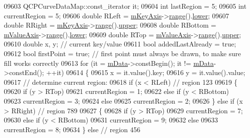 \begin{DoxyCode}
09603   QCPCurveDataMap::const\_iterator it;
09604   \textcolor{keywordtype}{int} lastRegion = 5;
09605   \textcolor{keywordtype}{int} currentRegion = 5;
09606   \textcolor{keywordtype}{double} RLeft = \hyperlink{a00024_a692421b963472fa6e16156a74ba96832}{mKeyAxis}->\hyperlink{a00025_ab1ea79a4f5ea4cf42620f8f51c477ac4}{range}().\hyperlink{a00049_aa3aca3edb14f7ca0c85d912647b91745}{lower};
09607   \textcolor{keywordtype}{double} RRight = \hyperlink{a00024_a692421b963472fa6e16156a74ba96832}{mKeyAxis}->\hyperlink{a00025_ab1ea79a4f5ea4cf42620f8f51c477ac4}{range}().\hyperlink{a00049_ae44eb3aafe1d0e2ed34b499b6d2e074f}{upper};
09608   \textcolor{keywordtype}{double} RBottom = \hyperlink{a00024_acfc46d619ab9598be33b64146da45822}{mValueAxis}->\hyperlink{a00025_ab1ea79a4f5ea4cf42620f8f51c477ac4}{range}().\hyperlink{a00049_aa3aca3edb14f7ca0c85d912647b91745}{lower};
09609   \textcolor{keywordtype}{double} RTop = \hyperlink{a00024_acfc46d619ab9598be33b64146da45822}{mValueAxis}->\hyperlink{a00025_ab1ea79a4f5ea4cf42620f8f51c477ac4}{range}().\hyperlink{a00049_ae44eb3aafe1d0e2ed34b499b6d2e074f}{upper};
09610   \textcolor{keywordtype}{double} x, y; \textcolor{comment}{// current key/value}
09611   \textcolor{keywordtype}{bool} addedLastAlready = \textcolor{keyword}{true};
09612   \textcolor{keywordtype}{bool} firstPoint = \textcolor{keyword}{true}; \textcolor{comment}{// first point must always be drawn, to make sure fill works correctly}
09613   \textcolor{keywordflow}{for} (it = \hyperlink{a00028_a88d533e455bca96004b049e99168731b}{mData}->constBegin(); it != \hyperlink{a00028_a88d533e455bca96004b049e99168731b}{mData}->constEnd(); ++it)
09614   \{
09615     x = it.value().key;
09616     y = it.value().value;
09617     \textcolor{comment}{// determine current region:}
09618     \textcolor{keywordflow}{if} (x < RLeft) \textcolor{comment}{// region 123}
09619     \{
09620       \textcolor{keywordflow}{if} (y > RTop)
09621         currentRegion = 1;
09622       \textcolor{keywordflow}{else} \textcolor{keywordflow}{if} (y < RBottom)
09623         currentRegion = 3;
09624       \textcolor{keywordflow}{else}
09625         currentRegion = 2;
09626     \} \textcolor{keywordflow}{else} \textcolor{keywordflow}{if} (x > RRight) \textcolor{comment}{// region 789}
09627     \{
09628       \textcolor{keywordflow}{if} (y > RTop)
09629         currentRegion = 7;
09630       \textcolor{keywordflow}{else} \textcolor{keywordflow}{if} (y < RBottom)
09631         currentRegion = 9;
09632       \textcolor{keywordflow}{else}
09633         currentRegion = 8;
09634     \} \textcolor{keywordflow}{else} \textcolor{comment}{// region 456}

\end{DoxyCode}
